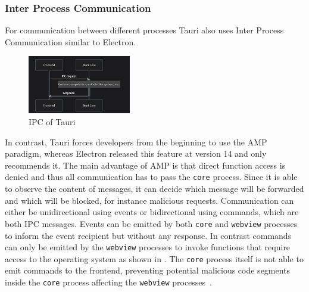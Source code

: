 \subsubsection{Inter Process Communication}
For communication between different processes Tauri also uses Inter Process Communication similar to Electron.
\begin{figure}[ht]
    \centering
    \includegraphics[width=0.4\textwidth]{images/TauriIPC}
    \caption{IPC of Tauri~\cite[Figure 1--3]{tauri}}
    \label{fig:tauri:ipc}
\end{figure}
In contrast, Tauri forces developers from the beginning to use the \ac{AMP} paradigm, whereas Electron released this feature at version 14 and only recommends it.
The main advantage of \ac{AMP} is that direct function access is denied and thus all communication has to pass the \texttt{core} process.
Since it is able to observe the content of messages, it can decide which message will be forwarded and which will be blocked, for instance malicious requests.
Communication can either be unidirectional using events or bidirectional using commands, which are both \ac{IPC} messages.
Events can be emitted by both \texttt{core} and \texttt{webview} processes to inform the event recipient but without any response.
In contrast commands can only be emitted by the \texttt{webview} processes to invoke functions that require access to the operating system as shown in .
The \texttt{core} process itself is not able to emit commands to the frontend, preventing potential malicious code segments inside the \texttt{core} process affecting the \texttt{webview} processes~\cite{tauri}.


